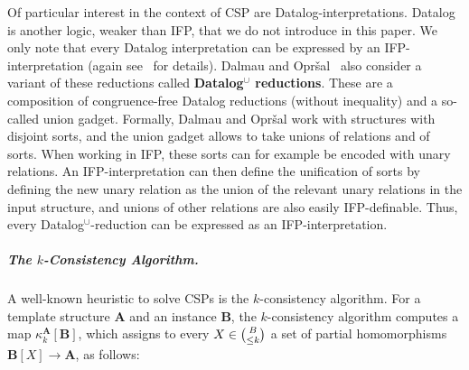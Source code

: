 \documentclass[a4paper,english, thm-restate]{lipics-v2021}
\newcommand{\defining}[1]{\textbf{#1}}
\newcommand{\StructA}{\mathbf{A}}
\newcommand{\StructB}{\mathbf{B}}
\newcommand{\kcol}[3]{\kappa_{#1}^{#2}[#3]}
\begin{document}
	Of particular interest in the context of CSP are Datalog-interpretations.
	Datalog is another logic, weaker than IFP, that we do not introduce in this paper.
	We only note that every Datalog interpretation can be expressed by an IFP-interpretation (again see~\cite[Theorem~9.1.4]{EbbinghausFlum1995} for details).
	Dalmau and Opr\v{s}al~\cite{DalmauOprsal2024}
	also consider a variant of these reductions called \defining{Datalog$^\cup$ reductions}.
	These are a composition of congruence-free Datalog reductions (without inequality) and a so-called union gadget.
	Formally, Dalmau and Opr\v{s}al work with structures with disjoint sorts, and the union gadget allows to take unions of relations and of sorts. 
	When working in IFP, these sorts can for example be encoded with unary relations. An IFP-interpretation can then define the unification of sorts by defining the new unary relation as the union of the relevant unary relations in the input structure, and unions of other relations are also easily IFP-definable.
	Thus, every Datalog$^\cup$-reduction can be expressed as an IFP-interpretation.
	
	
	
	
	
	\subparagraph{The $k$-Consistency Algorithm.}
	A well-known heuristic to solve CSPs is the $k$-consistency algorithm.
	For a template structure $\StructA$ and an instance $\StructB$,
	the $k$-consistency algorithm computes a map $\kcol{k}{\StructA}{\StructB}$,
	which assigns to every $X \in \tbinom{B} {\leq k}$
	a set of partial homomorphisms $\StructB[X] \to \StructA$, as follows:
	
\end{document}
